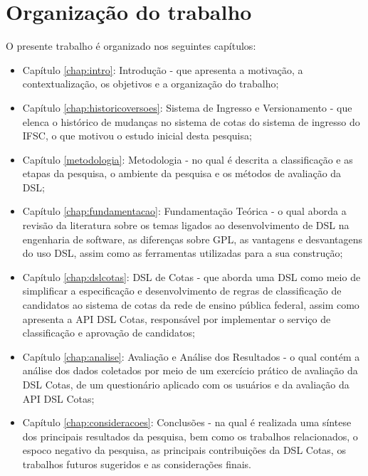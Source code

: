 \section{Organização do trabalho}
\label{organizacao}

O presente trabalho é organizado nos seguintes capítulos:

\begin{itemize}
    \item Capítulo \ref{chap:intro}: Introdução - que apresenta a motivação, a contextualização, os objetivos e a organização do trabalho;
    \item Capítulo \ref{chap:historicoversoes}: Sistema de Ingresso e Versionamento - que elenca o histórico de mudanças no sistema de cotas do sistema de ingresso do \gls{IFSC}, o que motivou o estudo inicial desta pesquisa;
    \item Capítulo \ref{metodologia}: Metodologia - no qual é descrita a classificação e as etapas da pesquisa, o ambiente da pesquisa e os métodos de avaliação da DSL;
    \item Capítulo \ref{chap:fundamentacao}: Fundamentação Teórica - o qual aborda a revisão da literatura sobre os temas ligados ao desenvolvimento de \gls{DSL} na engenharia de software, as diferenças sobre \gls{GPL}, as vantagens e desvantagens do uso  \gls{DSL}, assim como as ferramentas utilizadas para a sua construção;
    \item Capítulo \ref{chap:dslcotas}: DSL de Cotas - que aborda uma \gls{DSL} como meio de simplificar a especificação e desenvolvimento de regras de classificação de candidatos ao sistema de cotas da rede de ensino pública federal, assim como apresenta a \gls{API} DSL Cotas, responsável por implementar o serviço de classificação e aprovação de candidatos;
    \item Capítulo \ref{chap:analise}: Avaliação e Análise dos Resultados - o qual contém a análise dos dados coletados por meio de um exercício prático de avaliação da DSL Cotas, de um questionário aplicado com os usuários e da avaliação da
    \gls{API} DSL Cotas;
    \item Capítulo \ref{chap:consideracoes}: Conclusões - na qual é realizada uma síntese dos principais resultados da pesquisa, bem como os trabalhos relacionados, o espoco negativo da pesquisa, as principais contribuições da DSL Cotas, os trabalhos futuros sugeridos e as considerações finais.
\end{itemize}
